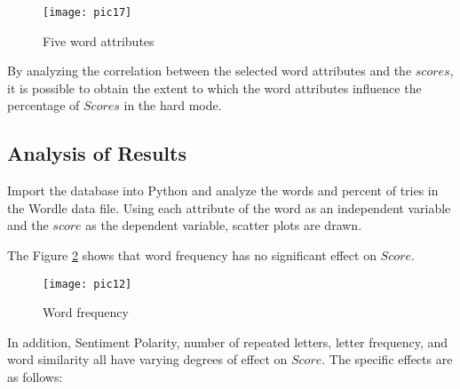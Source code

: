 \documentclass[12pt]{article}  %
\begin{document}
\begin{figure}[htbp]  %
	\centering  %
	\texttt{[image: pic17]} %
	\caption{Five word attributes}  
	\label{pic17}
\end{figure}
\vspace{-0.5cm}

By analyzing the correlation between the selected word attributes and the $scores$, it is possible to obtain the extent to which the word attributes influence the percentage of $Scores$ in the hard mode.



\subsection{Analysis of Results}
Import the database into Python and analyze the words and percent of tries in the Wordle data file. Using each attribute of the word as an independent variable and the $score$ as the dependent variable, scatter plots are drawn.

The Figure \ref{pic} shows that word frequency has no significant effect on $Score$. 

\begin{figure}[H]  %
	\centering  %
	\texttt{[image: pic12]} %
	\caption{Word frequency}  
	\label{pic}
\end{figure}
\vspace{-0.5cm}

In addition, Sentiment Polarity, number of repeated letters, letter frequency, and word similarity all have varying degrees of effect on $Score$. The specific effects are as follows:
\end{document}
